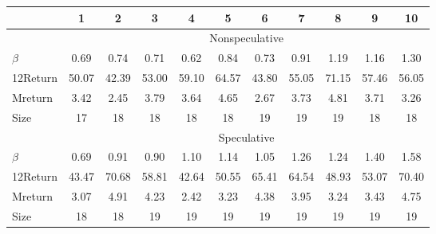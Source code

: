 \begin{tabular}{lcccccccccc}
	\toprule
	& 1     & 2     & 3     & 4     & 5     & 6     & 7     & 8     & 9     & 10 \\
	\midrule
	& \multicolumn{10}{c}{Nonspeculative} \\
	\midrule
	
	$\beta$  & 0.69  & 0.74  & 0.71  & 0.62  & 0.84  & 0.73  & 0.91  & 1.19  & 1.16  & 1.30 \\
	\multicolumn{1}{l}{12Return} & 50.07 & 42.39 & 53.00 & 59.10 & 64.57 & 43.80 & 55.05 & 71.15 & 57.46 & 56.05 \\
	\multicolumn{1}{l}{Mreturn} & 3.42  & 2.45  & 3.79  & 3.64  & 4.65  & 2.67  & 3.73  & 4.81  & 3.71  & 3.26 \\
	\multicolumn{1}{l}{Size} & 17    & 18    & 18    & 18    & 18    & 19    & 19    & 19    & 18    & 18 \\
	\midrule
	& \multicolumn{10}{c}{Speculative} \\
	\midrule
	$\beta$  & 0.69  & 0.91  & 0.90  & 1.10  & 1.14  & 1.05  & 1.26  & 1.24  & 1.40  & 1.58 \\
	\multicolumn{1}{l}{12Return} & 43.47 & 70.68 & 58.81 & 42.64 & 50.55 & 65.41 & 64.54 & 48.93 & 53.07 & 70.40 \\
	\multicolumn{1}{l}{Mreturn} & 3.07  & 4.91  & 4.23  & 2.42  & 3.23  & 4.38  & 3.95  & 3.24  & 3.43  & 4.75 \\
	\multicolumn{1}{l}{Size} & 18    & 18    & 19    & 19    & 19    & 19    & 19    & 19    & 19    & 19 \\
	
	\bottomrule
	
	
\end{tabular}%